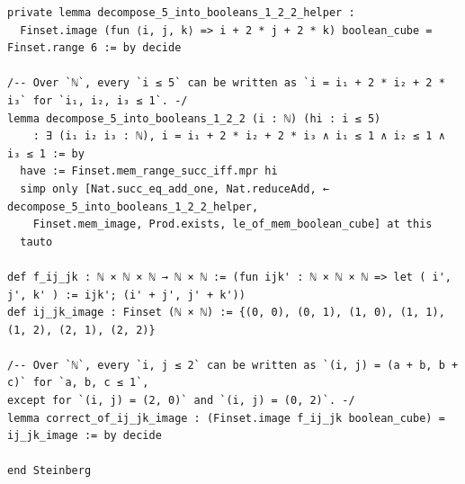 \documentclass[10pt,a4paper]{article}
\begin{document}
\begin{Verbatim}
private lemma decompose_5_into_booleans_1_2_2_helper :
  Finset.image (fun ⟨i, j, k⟩ => i + 2 * j + 2 * k) boolean_cube = Finset.range 6 := by decide

/-- Over `ℕ`, every `i ≤ 5` can be written as `i = i₁ + 2 * i₂ + 2 * i₃` for `i₁, i₂, i₃ ≤ 1`. -/
lemma decompose_5_into_booleans_1_2_2 (i : ℕ) (hi : i ≤ 5)
    : ∃ (i₁ i₂ i₃ : ℕ), i = i₁ + 2 * i₂ + 2 * i₃ ∧ i₁ ≤ 1 ∧ i₂ ≤ 1 ∧ i₃ ≤ 1 := by
  have := Finset.mem_range_succ_iff.mpr hi
  simp only [Nat.succ_eq_add_one, Nat.reduceAdd, ← decompose_5_into_booleans_1_2_2_helper,
    Finset.mem_image, Prod.exists, le_of_mem_boolean_cube] at this
  tauto

def f_ij_jk : ℕ × ℕ × ℕ → ℕ × ℕ := (fun ijk' : ℕ × ℕ × ℕ => let ( i', j', k' ) := ijk'; (i' + j', j' + k'))
def ij_jk_image : Finset (ℕ × ℕ) := {(0, 0), (0, 1), (1, 0), (1, 1), (1, 2), (2, 1), (2, 2)}

/-- Over `ℕ`, every `i, j ≤ 2` can be written as `(i, j) = (a + b, b + c)` for `a, b, c ≤ 1`,
except for `(i, j) = (2, 0)` and `(i, j) = (0, 2)`. -/
lemma correct_of_ij_jk_image : (Finset.image f_ij_jk boolean_cube) = ij_jk_image := by decide

end Steinberg
\end{Verbatim}
\end{document}
